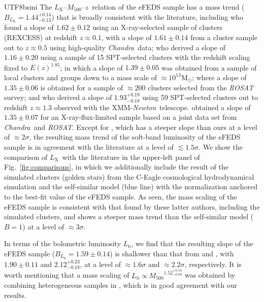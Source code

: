 \documentclass[longauth]{aa}
\newcommand{\Msun}{\ensuremath{\mathrm{M}_{\odot}}}
\newcommand{\Mfiveoo}{\ensuremath{M_{500}}}
\newcommand{\redshift}{\ensuremath{z}}
\newcommand{\CHANDRA}{\emph{Chandra}}
\newcommand{\XMMNEWTON}{XMM-\emph{Newton}}
\newcommand{\ROSAT}{\emph{ROSAT}}
\newcommand{\Lx}{\ensuremath{L_{\mathrm{X}}}}
\newcommand{\Lb}{\ensuremath{L_{\mathrm{b}}}}
\newcommand{\Blx}{\ensuremath{B_{L_{\mathrm{X}}}}}
\newcommand{\Blb}{\ensuremath{B_{L_{\mathrm{b}}}}}
\newcommand{\ansBlx}{\ensuremath{ 1.44^{+0.14}_{-0.13} }}
\newcommand{\ansBlb}{\ensuremath{ 1.59\pm 0.14 }}
\begin{document}
\begin{CJK*}{UTF8}{bsmi}
The \Lx--\Mfiveoo--\redshift\ relation of the eFEDS sample has a mass trend ($\Blx = \ansBlx$) that is broadly consistent with the literature, including 
\cite{pratt09} who found a slope of $1.62\pm0.12$ using an X-ray-selected sample of clusters (REXCESS) at redshift $\redshift\approx0.1$,
\cite{vikhlinin09a} with a slope of $1.61\pm0.14$ from a cluster sample out to $\redshift\approx0.5$ using high-quality \CHANDRA\ data;
\cite{andersson11} who derived a slope of $1.16\pm0.20$ using a sample of 15 SPT-selected clusters with the redshift scaling fixed to $E(\redshift)^{1.85}$; 
\cite{lovisari15} in which a slope of $1.39\pm0.05$ was obtained from a sample of local clusters and groups down to a mass scale of $\approx10^{13}\Msun$; 
\cite{mantz16b} where a slope of $1.35\pm0.06$ is obtained for a sample of $\approx200$ clusters selected from the \textit{ROSAT} survey;
and \cite{bulbul19} who derived a slope of $1.93^{+0.19}_{-0.18}$ using 59 SPT-selected clusters out to redshift $\redshift\approx1.3$ observed with the \XMMNEWTON\ telescope.
\cite{schellenberger17} obtained a slope of $1.35\pm0.07$ for an X-ray-flux-limited sample based on a joint data set from \CHANDRA\ and \ROSAT.
Except for \cite{bulbul19}, which has a steeper slope than ours at a level of $\approx2\sigma$, the resulting mass trend of the soft-band luminosity of the eFEDS sample is in agreement with the literature at a level of $\lesssim1.5\sigma$.
We show the comparison of \Lx\ with the literature in the upper-left panel of Fig.~\ref{fig:comparisons}, in which we additionally include the result of the simulated clusters (golden stars) from the C-Eagle cosmological hydrodynamical simulation \citep{barnes17} and the self-similar model (blue line) with the normalization anchored to the best-fit value of the eFEDS sample.
As seen, the mass scaling of the eFEDS sample is consistent with that found by these latter authors, including the simulated clusters, and shows a steeper mass trend than the self-similar model ($B = 1$) at a level of $\approx3\sigma$.


In terms of the bolometric luminosity \Lb, we find that the resulting slope of the eFEDS sample ($\Blb = \ansBlb$) is shallower than that from \cite{pratt09} and \cite{bulbul19}, with $1.90\pm0.11$ and $2.12^{+0.23}_{-0.18}$, at a level of $\approx1.6\sigma$ and $\approx2.2\sigma$, respectively.
It is worth mentioning that a mass scaling of $\Lb\propto{\Mfiveoo}^{1.52^{+0.10}_{-0.09}}$ was obtained by combining heterogeneous samples in \cite{reichert11}, which is in good agreement with our results.




\end{CJK*}
\end{document}
